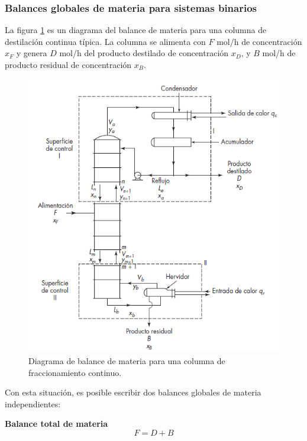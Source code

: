 \documentclass[11pt]{book}
\begin{document}
\subsubsection{Balances globales de materia para sistemas binarios}

La figura \ref{fig:ColumnaDestilacionPorParte} es un diagrama del balance de materia para una columna de destilación continua típica. La columna se alimenta con $F$ mol/h de concentración $x_F$ y genera $D$ mol/h del producto destilado de concentración $x_D$, y $B$ mol/h de producto residual de concentración $x_B$. 

\begin{figure}[H]
    \centering
    \includegraphics{img/destilacion/ColumnaDestilacionPorParte.PNG}
    \caption{Diagrama de balance de materia para una columna de fraccionamiento continuo.}
    \label{fig:ColumnaDestilacionPorParte}
\end{figure}

Con esta situación, es posible escribir dos balances globales de materia independientes:

\vspace{0.2cm}

\textbf{Balance total de materia}
\begin{equation}
    \label{eq:BalanceDestilacion_1}
    F = D + B
\end{equation}
\end{document}
